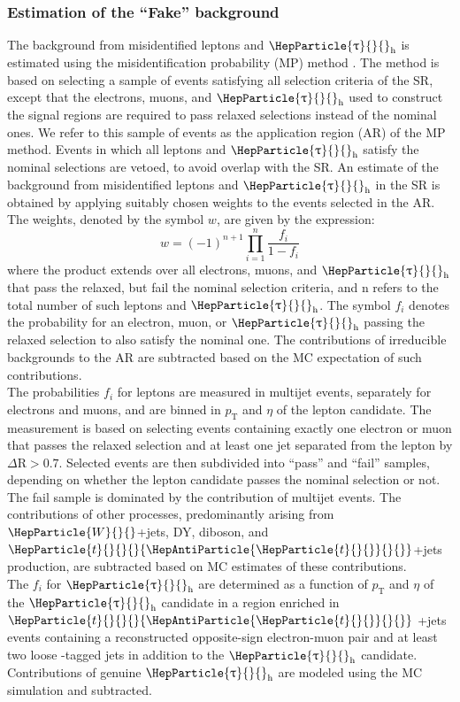 \documentclass[11.5pt, a4paper]{article}
\newcommand{\pt}{\ensuremath{p_{\mathrm{T}}}\xspace}
\newcommand{\DR}{\Delta\text{R}}
\DeclareRobustCommand{\PW}{{\HepParticle{W}{}{}}\xspace}
\DeclareRobustCommand{\PQb}{{\HepParticle{b}{}{}}\xspace} %
\DeclareRobustCommand{\PQt}{\HepParticle{t}{}{}} %
\DeclareRobustCommand{\PAQt}{{\HepAntiParticle{\PQt}{}{}}\xspace} %
\DeclareRobustCommand{\PGt}{{\HepParticle{\uptau}{}{}}\xspace} %
\newcommand{\ttbar}{\PQt{}\PAQt} %
\newcommand{\tauh}{\ensuremath{\PGt_\mathrm{h}}\xspace}
\begin{document}
\subsubsection{Estimation of the “Fake” background}\label{fake_bkg}
The background from misidentified leptons and $\tauh$ is estimated using the misidentification
probability (MP) method \cite{CMS:2018fdh}. The method is based on selecting a sample of events satisfying all selection criteria of the SR, except that the electrons, muons, and $\tauh$ used to construct the signal regions are required to pass relaxed selections instead of the nominal ones. We refer to this sample of events as the application region (AR) of the MP method.
Events in which all leptons and $\tauh$ satisfy the nominal selections are vetoed, to avoid overlap with the SR. An estimate of the background from misidentified leptons and $\tauh$ in the SR is obtained by applying suitably chosen weights to the events selected in the AR. The weights, denoted by the symbol $w$, are given by the expression:
\begin{equation}
	w = (-1)^{n+1}\prod_{i=1}^{n}\frac{f_{i}}{1-f_{i}}
\end{equation}
where the product extends over all electrons, muons, and $\tauh$ that pass the relaxed, but fail the nominal selection criteria, and n refers to the total number of such leptons and $\tauh$. The symbol $f_{i}$ denotes the probability for an electron, muon, or $\tauh$ passing the relaxed selection to also satisfy the nominal one. The contributions of irreducible backgrounds to the AR are subtracted based on the MC expectation of such contributions.\\
The probabilities $f_{i}$ for leptons are measured in multijet events, separately for electrons and muons, and are binned in $\pt$ and $\eta$ of the lepton candidate. The measurement is based on
selecting events containing exactly one electron or muon that passes the relaxed selection and
at least one jet separated from the lepton by $\DR > 0.7$. Selected events are then subdivided into “pass” and “fail” samples, depending on whether the lepton candidate passes the nominal selection or not. The fail sample is dominated by the contribution of multijet events. The
contributions of other processes, predominantly arising from $\PW$+jets, DY, diboson, and $\ttbar$+jets
production, are subtracted based on MC estimates of these contributions.\\
The $f_{i}$ for $\tauh$ are determined as a function of $\pt$ and $\eta$ of the $\tauh$ candidate in a region enriched in $\ttbar$ +jets events containing a reconstructed opposite-sign electron-muon pair and at least two loose \PQb-tagged jets in addition to the $\tauh$ candidate. Contributions of genuine $\tauh$ are modeled using the MC simulation and subtracted.
\end{document}
